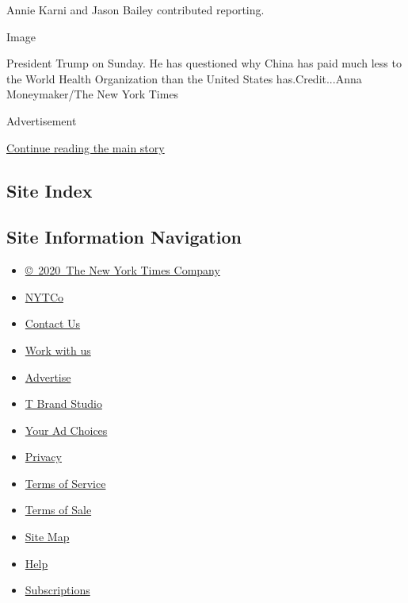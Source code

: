 Annie Karni and Jason Bailey contributed reporting.

Image

President Trump on Sunday. He has questioned why China has paid much
less to the World Health Organization than the United States
has.Credit...Anna Moneymaker/The New York Times

Advertisement

\protect\hyperlink{after-bottom}{Continue reading the main story}

\hypertarget{site-index}{%
\subsection{Site Index}\label{site-index}}

\hypertarget{site-information-navigation}{%
\subsection{Site Information
Navigation}\label{site-information-navigation}}

\begin{itemize}
\tightlist
\item
  \href{https://help.nytimes3xbfgragh.onion/hc/en-us/articles/115014792127-Copyright-notice}{©~2020~The
  New York Times Company}
\end{itemize}

\begin{itemize}
\tightlist
\item
  \href{https://www.nytco.com/}{NYTCo}
\item
  \href{https://help.nytimes3xbfgragh.onion/hc/en-us/articles/115015385887-Contact-Us}{Contact
  Us}
\item
  \href{https://www.nytco.com/careers/}{Work with us}
\item
  \href{https://nytmediakit.com/}{Advertise}
\item
  \href{http://www.tbrandstudio.com/}{T Brand Studio}
\item
  \href{https://www.nytimes3xbfgragh.onion/privacy/cookie-policy\#how-do-i-manage-trackers}{Your
  Ad Choices}
\item
  \href{https://www.nytimes3xbfgragh.onion/privacy}{Privacy}
\item
  \href{https://help.nytimes3xbfgragh.onion/hc/en-us/articles/115014893428-Terms-of-service}{Terms
  of Service}
\item
  \href{https://help.nytimes3xbfgragh.onion/hc/en-us/articles/115014893968-Terms-of-sale}{Terms
  of Sale}
\item
  \href{https://spiderbites.nytimes3xbfgragh.onion}{Site Map}
\item
  \href{https://help.nytimes3xbfgragh.onion/hc/en-us}{Help}
\item
  \href{https://www.nytimes3xbfgragh.onion/subscription?campaignId=37WXW}{Subscriptions}
\end{itemize}

